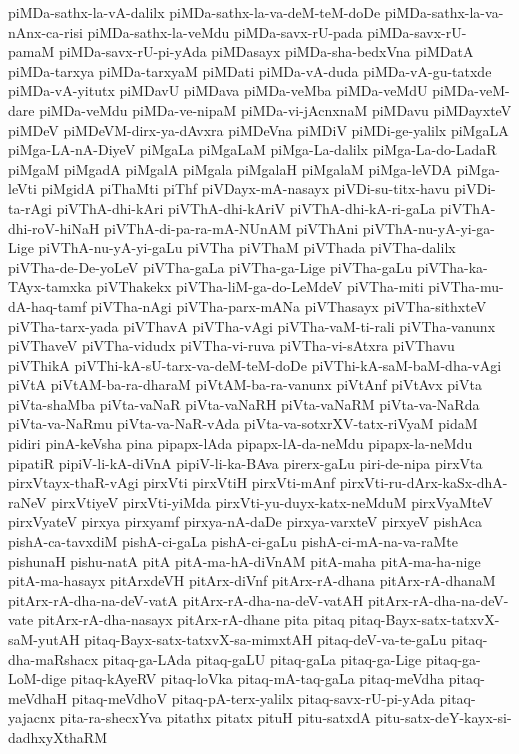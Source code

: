 {piMDa-sathx-la-vA-dalilx
piMDa-sathx-la-va-deM-teM-doDe
piMDa-sathx-la-va-nAnx-ca-risi
piMDa-sathx-la-veMdu
piMDa-savx-rU-pada
piMDa-savx-rU-pamaM
piMDa-savx-rU-pi-yAda
piMDasayx
piMDa-sha-bedxVna
piMDatA
piMDa-tarxya
piMDa-tarxyaM
piMDati
piMDa-vA-duda
piMDa-vA-gu-tatxde
piMDa-vA-yitutx
piMDavU
piMDava
piMDa-veMba
piMDa-veMdU
piMDa-veM-dare
piMDa-veMdu
piMDa-ve-nipaM
piMDa-vi-jAcnxnaM
piMDavu
piMDayxteV
piMDeV
piMDeVM-dirx-ya-dAvxra
piMDeVna
piMDiV
piMDi-ge-yalilx
piMgaLA
piMga-LA-nA-DiyeV
piMgaLa
piMgaLaM
piMga-La-dalilx
piMga-La-do-LadaR
piMgaM
piMgadA
piMgalA
piMgala
piMgalaH
piMgalaM
piMga-leVDA
piMga-leVti
piMgidA
piThaMti
piThf
piVDayx-mA-nasayx
piVDi-su-titx-havu
piVDi-ta-rAgi
piVThA-dhi-kAri
piVThA-dhi-kAriV
piVThA-dhi-kA-ri-gaLa
piVThA-dhi-roV-hiNaH
piVThA-di-pa-ra-mA-NUnAM
piVThAni
piVThA-nu-yA-yi-ga-Lige
piVThA-nu-yA-yi-gaLu
piVTha
piVThaM
piVThada
piVTha-dalilx
piVTha-de-De-yoLeV
piVTha-gaLa
piVTha-ga-Lige
piVTha-gaLu
piVTha-ka-TAyx-tamxka
piVThakekx
piVTha-liM-ga-do-LeMdeV
piVTha-miti
piVTha-mu-dA-haq-tamf
piVTha-nAgi
piVTha-parx-mANa
piVThasayx
piVTha-sithxteV
piVTha-tarx-yada
piVThavA
piVTha-vAgi
piVTha-vaM-ti-rali
piVTha-vanunx
piVThaveV
piVTha-vidudx
piVTha-vi-ruva
piVTha-vi-sAtxra
piVThavu
piVThikA
piVThi-kA-sU-tarx-va-deM-teM-doDe
piVThi-kA-saM-baM-dha-vAgi
piVtA
piVtAM-ba-ra-dharaM
piVtAM-ba-ra-vanunx
piVtAnf
piVtAvx
piVta
piVta-shaMba
piVta-vaNaR
piVta-vaNaRH
piVta-vaNaRM
piVta-va-NaRda
piVta-va-NaRmu
piVta-va-NaR-vAda
piVta-va-sotxrXV-tatx-riVyaM
pidaM
pidiri
pinA-keVsha
pina
pipapx-lAda
pipapx-lA-da-neMdu
pipapx-la-neMdu
pipatiR
pipiV-li-kA-diVnA
pipiV-li-ka-BAva
pirerx-gaLu
piri-de-nipa
pirxVta
pirxVtayx-thaR-vAgi
pirxVti
pirxVtiH
pirxVti-mAnf
pirxVti-ru-dArx-kaSx-dhA-raNeV
pirxVtiyeV
pirxVti-yiMda
pirxVti-yu-duyx-katx-neMduM
pirxVyaMteV
pirxVyateV
pirxya
pirxyamf
pirxya-nA-daDe
pirxya-varxteV
pirxyeV
pishAca
pishA-ca-tavxdiM
pishA-ci-gaLa
pishA-ci-gaLu
pishA-ci-mA-na-va-raMte
pishunaH
pishu-natA
pitA
pitA-ma-hA-diVnAM
pitA-maha
pitA-ma-ha-nige
pitA-ma-hasayx
pitArxdeVH
pitArx-diVnf
pitArx-rA-dhana
pitArx-rA-dhanaM
pitArx-rA-dha-na-deV-vatA
pitArx-rA-dha-na-deV-vatAH
pitArx-rA-dha-na-deV-vate
pitArx-rA-dha-nasayx
pitArx-rA-dhane
pita
pitaq
pitaq-Bayx-satx-tatxvX-saM-yutAH
pitaq-Bayx-satx-tatxvX-sa-mimxtAH
pitaq-deV-va-te-gaLu
pitaq-dha-maRshacx
pitaq-ga-LAda
pitaq-gaLU
pitaq-gaLa
pitaq-ga-Lige
pitaq-ga-LoM-dige
pitaq-kAyeRV
pitaq-loVka
pitaq-mA-taq-gaLa
pitaq-meVdha
pitaq-meVdhaH
pitaq-meVdhoV
pitaq-pA-terx-yalilx
pitaq-savx-rU-pi-yAda
pitaq-yajacnx
pita-ra-shecxYva
pitathx
pitatx
pituH
pitu-satxdA
pitu-satx-deY-kayx-si-dadhxyXthaRM
}
